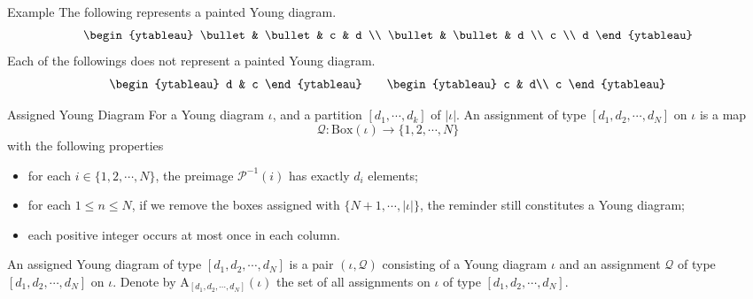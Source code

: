 \documentclass[fleqn,xcolor=dvipsnames]{beamer}
\newcommand{\CP}{{\mathcal {P}}}
\newcommand{\CQ}{{\mathcal {Q}}}
\newcommand{\RA}{{\mathrm {A}}}
\begin{document}
\begin{frame}
  \begin{block}{Example}
    The following represents a painted Young diagram.
    \[
    \begin{ytableau}
        \bullet & \bullet & c & d  \\
        \bullet & \bullet & d \\
        c \\
        d
    \end{ytableau}
    \]
    Each of the followings does not represent a painted Young diagram.
    \[
    \begin{ytableau}
      d & c
    \end{ytableau}
    \qquad
    \begin{ytableau}
      c & d\\
      c
    \end{ytableau}
    \]
  \end{block}
  
\end{frame}






\begin{frame}
  \begin{block}{Assigned Young Diagram}
    For a Young diagram $\iota$, and a partition $[d_1, \cdots, d_k]$ of $|\iota|$.  An assignment of type $[d_1,d_2, \cdots, d_N]$ on $\iota$ is a map
   $$\CQ: \mathrm{Box}(\iota) \to \{1,2, \cdots,N\} $$
   with the following properties

   \begin{itemize}
      \item for each $i \in \{1,2,\cdots,N\}$, the preimage $\CP^{-1}(i)$ has exactly $d_i$ elements;
      \item for each $1 \leq n \leq N$, if we remove the boxes assigned with $\{N+1, \cdots, |\iota|\}$, the reminder still constitutes a Young diagram;
      \item each positive integer occurs at most once in each column.
   \end{itemize}
   An assigned Young diagram of type $[d_1,d_2, \cdots, d_N]$ is a pair $(\iota,\CQ)$ consisting of a Young diagram $\iota$ and an assignment $\CQ$ of type $[d_1,d_2, \cdots, d_N]$ on $\iota$. Denote by $\RA_{[d_1,d_2,\cdots,d_N]}(\iota)$ the set of all assignments on $\iota$ of type $[d_1,d_2,\cdots,d_N]$.
  \end{block}
\end{frame}
\end{document}
